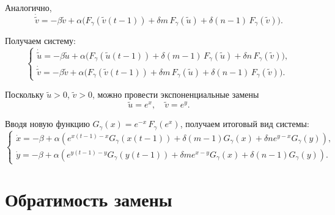 Аналогично,
\[
\dot{\tilde{v}} = -\beta \tilde{v} + \alpha \big(F_{\gamma}(\tilde{v}(t - 1)) + \delta m \, F_{\gamma}(\tilde{u}) + \delta (n - 1) \, F_{\gamma}(\tilde{v})\big).
\]

Получаем систему:
%
\begin{equation}
	\label{eq:mg_cluster_system_tilde}
	\begin{cases}
		\dot{\tilde{u}} = -\beta \tilde{u} + \alpha \big(F_{\gamma}(\tilde{u}(t - 1)) + \delta (m - 1) \, F_{\gamma}(\tilde{u}) + \delta n \, F_{\gamma}(\tilde{v})\big),\\
		\dot{\tilde{v}} = -\beta \tilde{v} + \alpha \big(F_{\gamma}(\tilde{v}(t - 1)) + \delta m \, F_{\gamma}(\tilde{u}) + \delta (n - 1) \, F_{\gamma}(\tilde{v})\big).
	\end{cases}
\end{equation}

Поскольку $\tilde{u} > 0$, $\tilde{v} > 0$, можно провести экспоненциальные замены
\begin{equation}
	\label{eq:exp_change}
	\tilde{u} = e^x, \quad \tilde{v} = e^y.
\end{equation}

Вводя новую функцию $G_{\gamma}(x) = e^{-x} \, F_{\gamma}(e^x)$, получаем итоговый вид системы:
\small
\begin{equation}
	\label{eq:system_main}
	\begin{cases}
		\dot{x} = -\beta + \alpha \left(e^{x(t - 1) - x} G_{\gamma}(x(t - 1)) + \delta (m - 1) G_{\gamma}(x) + \delta n e^{y - x} G_{\gamma}(y)\right),\\
		\dot{y} = -\beta + \alpha \left(e^{y(t - 1) - y} G_{\gamma}(y(t - 1)) + \delta m e^{x - y} G_{\gamma}(x) + \delta (n - 1) G_{\gamma}(y)\right).
	\end{cases}
\end{equation}
\normalsize

\section{Обратимость замены}\label{sec:ch3/sect2}

